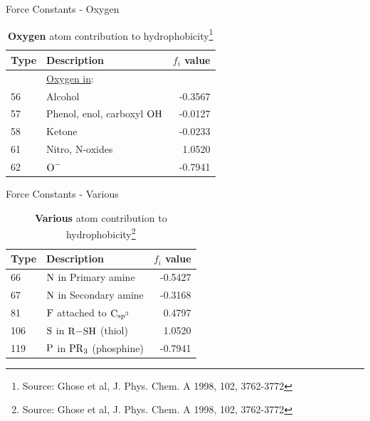 \documentclass{beamer}
\begin{document}
\begin{frame}{Force Constants - Oxygen}
    \centering
        \begin{table}[H]
            \caption{\textbf{Oxygen} atom contribution to hydrophobicity\footnote{Source: Ghose et al, J. Phys. Chem. A 1998, 102, 3762-3772}}
            \begin{tabular}{l l r}
                Type & Description & $f_i$ value \\
                \hline
                    & \underline{Oxygen in}:           &         \\
                56  & Alcohol                          & -0.3567 \\
                57  & Phenol, enol, carboxyl $\ce{OH}$ & -0.0127 \\
                58  & Ketone                           & -0.0233 \\
                61  & Nitro, N-oxides                  &  1.0520 \\
                62  & $\ce{O-}$                        & -0.7941 \\
                \hline
            \end{tabular}
        \end{table}
\end{frame}
\begin{frame}{Force Constants - Various}
    \centering
        \begin{table}[H]
            \caption{\textbf{Various} atom contribution to hydrophobicity\footnote{Source: Ghose et al, J. Phys. Chem. A 1998, 102, 3762-3772}}
            \begin{tabular}{l l r}
                Type & Description & $f_i$ value \\
                \hline
                66   & $\ce{N}$ in Primary amine              & -0.5427 \\
                67   & $\ce{N}$ in Secondary amine            & -0.3168 \\
                81   & $\ce{F}$ attached to $\ce{C_{sp^{3}}}$ &  0.4797 \\
                106  & $\ce{S}$ in $\ce{R-SH}$   (thiol)      &  1.0520 \\
                119  & $\ce{P}$ in $\ce{PR_{3}}$ (phosphine)  & -0.7941 \\
                \hline
            \end{tabular}
        \end{table}
\end{frame}
\end{document}

